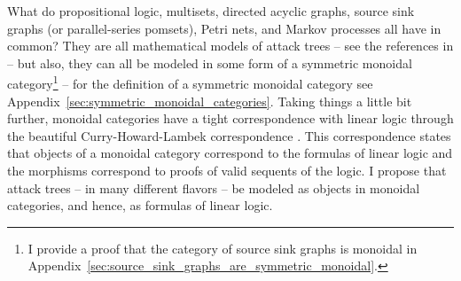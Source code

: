 \documentclass{llncs}
\begin{document}
What do propositional logic, multisets, directed acyclic graphs,
source sink graphs (or parallel-series pomsets), Petri nets, and
Markov processes all have in common?  They are all mathematical models
of attack trees -- see the references in
\cite{Kordy:2014a,Jhawar:2015} -- but also, they can all be modeled in
some form of a symmetric monoidal category\footnote{I provide a proof
  that the category of source sink graphs is monoidal in
  Appendix~\ref{sec:source_sink_graphs_are_symmetric_monoidal}.}
\cite{Tzouvaras:1998,Brown:1991,Fiore:2013,FrancescoAlbasini2010} --
for the definition of a symmetric monoidal category see
Appendix~\ref{sec:symmetric_monoidal_categories}.  Taking things a
little bit further, monoidal categories have a tight correspondence
with linear logic through the beautiful Curry-Howard-Lambek
correspondence \cite{MSC:4439568}.  This correspondence states that
objects of a monoidal category correspond to the formulas of linear
logic and the morphisms correspond to proofs of valid sequents of the
logic.  I propose that attack trees -- in many different flavors -- be
modeled as objects in monoidal categories, and hence, as formulas of
linear logic.
\end{document}
